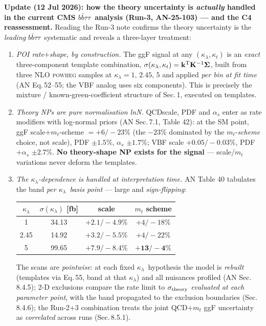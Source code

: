 \documentclass[11pt]{article}
\newcommand{\kl}{\ensuremath{\kappa_\lambda}}
\newcommand{\bbtt}{\ensuremath{b\bar b\tau\tau}}
\begin{document}
\medskip\noindent\textbf{Update (12 Jul 2026): how the theory uncertainty is \emph{actually} handled in the
current CMS \bbtt\ analysis (Run-3, AN-25-103) --- and the C4 reassessment.} Reading the Run-3 note confirms the
theory uncertainty is the \emph{leading} \bbtt\ systematic and reveals a three-layer treatment:
\begin{enumerate}[leftmargin=1.4em]
\item \emph{POI rate$+$shape, by construction.} The ggF signal at any $(\kl,\kappa_t)$ is an \emph{exact}
  three-component template combination, $\sigma(\kl,\kappa_t)=\mathbf k^{\rm T}\mathbf K^{-1}\boldsymbol\Sigma$,
  built from three NLO \textsc{powheg} samples at $\kl=1,\,2.45,\,5$ and applied \emph{per bin at fit time}
  (AN Eq.\,52--55; the VBF analog uses six components). This is precisely the mixture / known-green-coefficient
  structure of Sec.\,1, executed on templates.
\item \emph{Theory NPs are pure normalisation lnN.} QCDscale, PDF and $\alpha_s$ enter as rate modifiers with
  log-normal priors (AN Sec.\,7.1, Table 42): at the SM point, ggF scale$+m_t$-scheme $=+6/-23\%$ (the $-23\%$
  dominated by the $m_t$-\emph{scheme} choice, not scale), PDF $\pm1.5\%$, $\alpha_s$ $\pm1.7\%$; VBF scale
  $+0.05/-0.03\%$, PDF$+\alpha_s$ $\pm2.7\%$. \textbf{No theory-shape NP exists for the signal} --- scale/$m_t$
  variations never deform the templates.
\item \emph{The \kl-dependence is handled at interpretation time.} AN Table 40 tabulates the band \emph{per \kl\
  basis point} --- large and \emph{sign-flipping}:
\begin{center}\small
\begin{tabular}{@{}cccc@{}}\toprule
$\kl$ & $\sigma(\kl)$ [fb] & scale & $m_t$ scheme\\ \midrule
1 & 34.13 & $+2.1/-4.9\%$ & $+4/-18\%$\\
2.45 & 14.92 & $+3.2/-5.5\%$ & $+4/-22\%$\\
5 & 99.65 & $+7.9/-8.4\%$ & $\mathbf{+13/-4\%}$\\ \bottomrule
\end{tabular}
\end{center}
  The scans are \emph{pointwise}: at each fixed \kl\ hypothesis the model is \emph{rebuilt} (templates via
  Eq.\,55, band at that \kl) and all nuisances profiled (AN Sec.\,8.4.5); 2-D exclusions compare the rate limit
  to $\sigma_{\rm theory}$ \emph{evaluated at each parameter point}, with the band propagated to the exclusion
  boundaries (Sec.\,8.4.6); the Run-2$+$3 combination treats the joint QCD$+m_t$ ggF uncertainty as
  \emph{correlated} across runs (Sec.\,8.5.1).
\end{enumerate}
\end{document}
